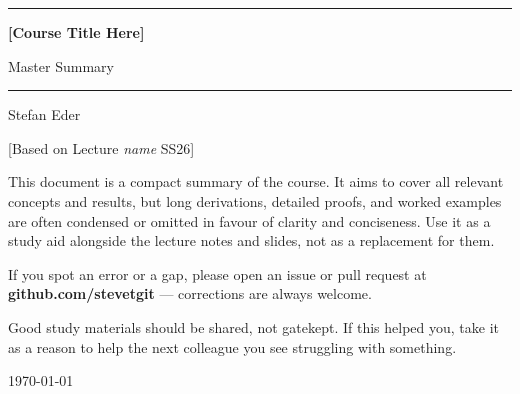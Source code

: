 \documentclass[11pt, oneside]{book}
\newcommand{\coursetitle}{[Course Title Here]}
\newcommand{\documenttype}{Master Summary}
\newcommand{\authorname}{Stefan Eder}
\newcommand{\basedon}{[Based on Lecture \emph{name} SS26]}
\begin{document}
\frontmatter  %


\thispagestyle{empty}
\vspace*{1.8cm}

\begin{center}
  {\color{accent}\rule{\linewidth}{1.8pt}}
  \vspace{0.65cm}

  {\fontsize{28}{34}\selectfont\bfseries\color{accent}\coursetitle\par}
  \vspace{0.25cm}
  {\large\color{gray!80!black}\documenttype\par}

  \vspace{0.55cm}
  {\color{accent!35}\rule{\linewidth}{0.5pt}}
  \vspace{0.55cm}

  {\large\authorname\par}
  \vspace{0.2cm}
  {\small\color{gray!70}\basedon\par}
\end{center}

\vspace{1.6cm}

\begin{center}
\begin{minipage}{0.84\textwidth}
  \small\color{gray!80!black}
  This document is a compact summary of the course.
  It aims to cover all relevant concepts and results, but long derivations,
  detailed proofs, and worked examples are often condensed or omitted in
  favour of clarity and conciseness.
  Use it as a study aid alongside the lecture notes and slides, not as a
  replacement for them.

  \medskip
  If you spot an error or a gap, please open an issue or pull request at
  \textbf{github.com/stevetgit} --- corrections are always welcome.

  \medskip
  \color{gray!60!black}
  Good study materials should be shared, not gatekept.
  If this helped you, take it as a reason to help the next colleague you see struggling with something.
\end{minipage}
\end{center}

\vfill
{\centering\small\color{gray!65} \today\par}
\clearpage
\end{document}
